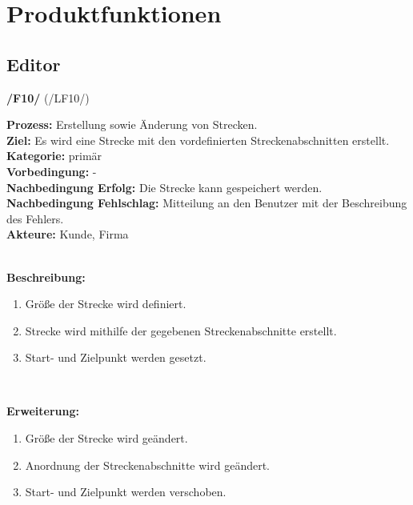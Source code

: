 \documentclass[11pt,a4paper]{article}
\begin{document}
	
	\pagebreak
	\section{Produktfunktionen}
	\subsection{Editor}
	\noindent\large\textbf{/F10/} (/LF10/)
	\normalsize\\
	\begin{addmargin}{0.1 \textwidth}
		\textbf{Prozess:} Erstellung sowie Änderung von Strecken.\\
		\textbf{Ziel:} Es wird eine Strecke mit den vordefinierten Streckenabschnitten erstellt.\\
		\textbf{Kategorie:} primär\\
		\textbf{Vorbedingung:} -\\
		\textbf{Nachbedingung Erfolg:} Die Strecke kann gespeichert werden.\\
		\textbf{Nachbedingung Fehlschlag:} Mitteilung an den Benutzer mit der Beschreibung des Fehlers.\\
		\textbf{Akteure:} Kunde, Firma\\
		\\
		\begin{minipage}{\textwidth}
			\textbf{Beschreibung:}
			\begin{enumerate}
				\item Größe der Strecke wird definiert.
				\item Strecke wird mithilfe der gegebenen Streckenabschnitte erstellt.
				\item Start- und Zielpunkt werden gesetzt.\\
			\end{enumerate}
		\end{minipage}
		\\
		\begin{minipage}{\textwidth}
			\textbf{Erweiterung:}
			\begin{enumerate}
				\item Größe der Strecke wird geändert.
				\item Anordnung der Streckenabschnitte wird geändert.
				\item Start- und Zielpunkt werden verschoben.\\
			\end{enumerate}
		\end{minipage}
	\end{addmargin}
\end{document}
